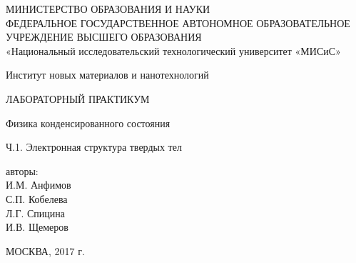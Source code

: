 \begin{titlepage}
\newpage

\begin{center}
МИНИСТЕРСТВО ОБРАЗОВАНИЯ И НАУКИ \\
ФЕДЕРАЛЬНОЕ ГОСУДАРСТВЕННОЕ АВТОНОМНОЕ ОБРАЗОВАТЕЛЬНОЕ УЧРЕЖДЕНИЕ ВЫСШЕГО ОБРАЗОВАНИЯ \\
«Национальный исследовательский технологический университет «МИСиС»

Институт новых материалов и нанотехнологий

\vspace{3cm}

ЛАБОРАТОРНЫЙ ПРАКТИКУМ

Физика конденсированного состояния

Ч.1. Электронная структура твердых тел

\vspace{3cm}

авторы: \\
И.М. Анфимов \\
С.П. Кобелева \\
Л.Г. Спицина \\
И.В. Щемеров

\vspace{5cm}

МОСКВА, 2017 г.
\end{center}

\end{titlepage}